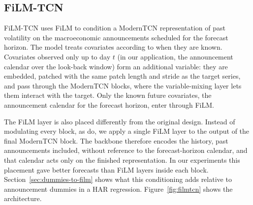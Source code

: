 %
\providecommand{\FiLMTCN}{FiLM-TCN}

\subsection{FiLM-TCN}
\label{sec:filmtcn}

\FiLMTCN{} uses FiLM to condition a ModernTCN representation of past
volatility on the macroeconomic announcements scheduled for the forecast
horizon. The model treats covariates according to when they are known.
Covariates observed only up to day $t$ (in our application, the announcement
calendar over the look-back window) form an additional variable: they are
embedded, patched with the same patch length and stride as the target series,
and pass through the ModernTCN blocks, where the variable-mixing layer lets
them interact with the target. Only the known future
covariates, the announcement calendar for the forecast horizon, enter through
FiLM.

The FiLM layer is also placed differently from the original design. Instead of
modulating every block, as \citet{perez2018film} do, we apply a single FiLM
layer to the output of the final ModernTCN block. The backbone therefore
encodes the history, past announcements included, without reference to the
forecast-horizon calendar, and that calendar acts only on the finished
representation. In our experiments this placement gave better forecasts than
FiLM layers inside each block.
Section~\ref{sec:dummies-to-film} shows what this conditioning adds relative
to announcement dummies in a HAR regression. Figure~\ref{fig:filmtcn} shows
the architecture.

